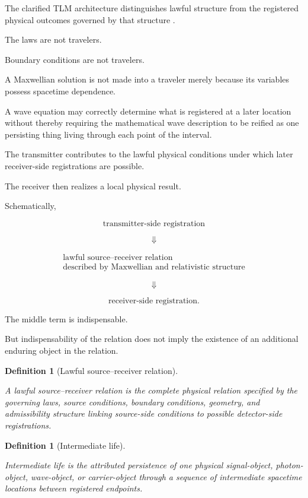 \documentclass[12pt,onecolumn]{article}
\newtheorem{definition}[proposition]{Definition}
\begin{document}
The clarified TLM architecture distinguishes lawful structure from the
registered physical outcomes governed by that structure
\cite{unified,generaltimelessness}.

The laws are not travelers.

Boundary conditions are not travelers.

A Maxwellian solution is not made into a traveler merely because its
variables possess spacetime dependence.

A wave equation may correctly determine what is registered at a later
location without thereby requiring the mathematical wave description to
be reified as one persisting thing living through each point of the
interval.

The transmitter contributes to the lawful physical conditions under
which later receiver-side registrations are possible.

The receiver then realizes a local physical result.

Schematically,

\[
\boxed{\text{transmitter-side registration}}
\]

\[
\Downarrow
\]

\[
\boxed{
\begin{array}{c}
\text{lawful source--receiver relation}\\
\text{described by Maxwellian and relativistic structure}
\end{array}}
\]

\[
\Downarrow
\]

\[
\boxed{\text{receiver-side registration}}.
\]

The middle term is indispensable.

But indispensability of the relation does not imply the existence of an
additional enduring object in the relation.

\begin{definition}[Lawful source--receiver relation]
\label{def:lawfulrelation}

A lawful source--receiver relation is the complete physical relation
specified by the governing laws, source conditions, boundary conditions,
geometry, and admissibility structure linking source-side conditions to
possible detector-side registrations.

\end{definition}

\begin{definition}[Intermediate life]
\label{def:intermediatelife}

Intermediate life is the attributed persistence of one physical
signal-object, photon-object, wave-object, or carrier-object through a
sequence of intermediate spacetime locations between registered
endpoints.

\end{definition}
\end{document}
